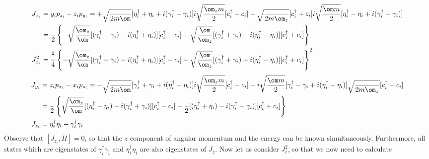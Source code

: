 \documentclass{article}
\begin{document}
$$
\begin{aligned}
J_{x_i} &= y_ip_{z_i} - z_ip_{y_i} =+ \sqrt{\frac{}{2m\om}}[\eta_i^\dagger + \eta_i+ i(\gamma_i^\dagger-\gamma_i)] i\sqrt{\frac{\om_z m}{2}}[c_i^\dagger - c_i] -  \sqrt{\frac{}{2m\om_z}}[c_i^\dagger+c_i]  i\sqrt{\frac{\om m}{2}}[\eta_i^\dagger - \eta_i + i(\gamma_i^\dagger + \gamma_i)] \\
&= \frac{}{2}\left\{-\sqrt{\frac{\om_z}{\om}}[(\gamma_i^\dagger-\gamma_i) -i(\eta_i^\dagger + \eta_i)] [c_i^\dagger - c_i] +  \sqrt{\frac{\om}{\om_z}} [ (\gamma_i^\dagger + \gamma_i) -i(\eta_i^\dagger - \eta_i)][c_i^\dagger+c_i] \right\}\\
J_{x_i}^2 &= \frac{^2}{4}\left\{-\sqrt{\frac{\om_z}{\om}}[(\gamma_i^\dagger-\gamma_i) -i(\eta_i^\dagger + \eta_i)] [c_i^\dagger - c_i] +  \sqrt{\frac{\om}{\om_z}} [ (\gamma_i^\dagger + \gamma_i) -i(\eta_i^\dagger - \eta_i)][c_i^\dagger+c_i] \right\}^2\\
\end{aligned}
$$
$$
\begin{aligned}
J_{y_i} &= z_ip_{x_i} - x_ip_{z_i} = - \sqrt{\frac{}{2m\om}}[\gamma_i^\dagger + \gamma_i+ i(\eta_i^\dagger-\eta_i)]i\sqrt{\frac{\om_z m}{2}}[c_i^\dagger - c_i] + i\sqrt{\frac{\om m}{2}}[\gamma_i^\dagger - \gamma_i + i(\eta_i^\dagger + \eta_i)]\sqrt{\frac{}{2m\om_z}}[c_i^\dagger+c_i]\\
&= \frac{}{2}\left\{\sqrt{\frac{\om_z}{\om}}[(\eta_i^\dagger-\eta_i) - i(\gamma_i^\dagger + \gamma_i)][c_i^\dagger - c_i] - \frac{}{2}[(\eta_i^\dagger + \eta_i)-i(\gamma_i^\dagger - \gamma_i)][c_i^\dagger+c_i]\right\}\\
J_{z_i}&=\eta_i^\dagger\eta_i - \gamma_i^\dagger\gamma_i\\
\end{aligned}
$$
Observe that $[J_{z_i},H]=0$, so that the $z$ component of angular momentum and the energy can be known simultaneously.  Furthermore, all states which are eigenstates of $\gamma_i^\dagger\gamma_i$ and $\eta_i^\dagger\eta_i$ are also eigenstates of $J_z$.
Now let us consider $J_i^2$, so that we now need to calculate
\end{document}

